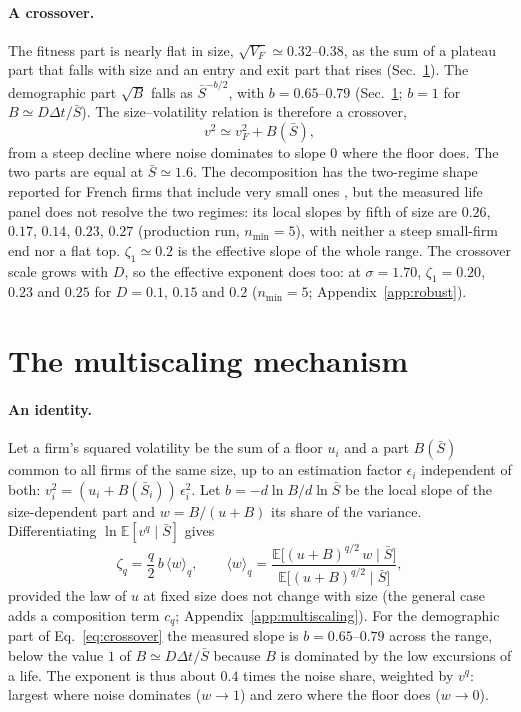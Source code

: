 \documentclass[pre,twocolumn,superscriptaddress,nofootinbib]{revtex4-2}
\newcommand{\E}{\mathbb E}
\newcommand{\Sb}{\bar S}
\begin{document}
\paragraph{A crossover.}  The fitness part is nearly flat in size,
$\sqrt{V_F}\simeq0.32$--$0.38$, as the sum of a plateau part that falls with size and an entry and exit
part that rises (Sec.~\ref{sec:multiscaling}).  The demographic part $\sqrt B$ falls as $\Sb^{-b/2}$, with $b=0.65$--$0.79$
(Sec.~\ref{sec:multiscaling}; $b=1$ for $B\simeq D\Delta t/\Sb$).  The size--volatility relation is therefore a
crossover,
\begin{equation}
v^2\simeq v_F^2+B(\Sb),
\label{eq:crossover}
\end{equation}
from a steep decline where noise dominates to slope $0$ where the floor does.  The two parts are equal
at $\Sb\simeq1.6$.  The decomposition has the two-regime shape reported for French firms that include
very small ones \cite{fontanelli2025}, but the measured life panel does not resolve the two regimes:
its local slopes by fifth of size are $0.26$, $0.17$, $0.14$, $0.23$, $0.27$ (production run, $n_{\min}=5$),
with neither a steep small-firm end nor a flat top.  $\zeta_1\simeq0.2$ is the effective slope of the whole
range.  The crossover scale grows with $D$, so the effective
exponent does too: at $\sigma=1.70$, $\zeta_1=0.20$, $0.23$ and $0.25$ for $D=0.1$, $0.15$ and $0.2$
($n_{\min}=5$; Appendix~\ref{app:robust}).

\section{The multiscaling mechanism}
\label{sec:multiscaling}

\paragraph{An identity.}  Let a firm's squared volatility be the sum of a floor $u_i$ and a part
$B(\Sb)$ common to all firms of the same size, up to an estimation factor $\epsilon_i$ independent of
both: $v_i^2=(u_i+B(\Sb_i))\,\epsilon_i^2$.  Let $b=-d\ln B/d\ln\Sb$ be the local slope of the size-dependent part
and $w=B/(u+B)$ its share of the variance.  Differentiating $\ln\E[v^q\mid\Sb]$ gives
\begin{equation}
\zeta_q=\frac q2\,b\,\langle w\rangle_q,\qquad
\langle w\rangle_q=\frac{\E\big[(u+B)^{q/2}\,w\mid\Sb\big]}{\E\big[(u+B)^{q/2}\mid\Sb\big]},
\label{eq:identity}
\end{equation}
provided the law of $u$ at fixed size does not change with size (the general case adds a composition
term $c_q$; Appendix~\ref{app:multiscaling}).  For the demographic part of Eq.~\eqref{eq:crossover} the measured slope is
$b=0.65$--$0.79$ across the range, below the value $1$ of $B\simeq D\Delta t/\Sb$ because $B$ is dominated by
the low excursions of a life.  The exponent is thus about $0.4$ times the noise share, weighted by
$v^q$: largest where noise dominates ($w\to1$) and zero where the floor does ($w\to0$).
\end{document}
